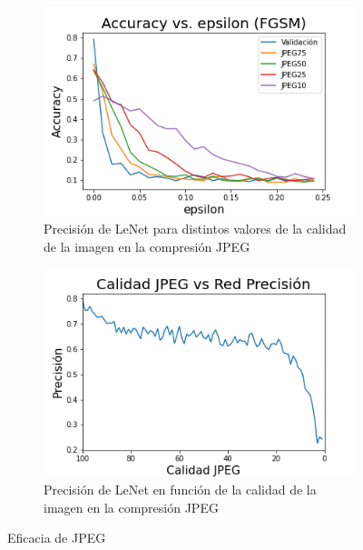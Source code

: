 \begin{figure}[h!]
    \centering
    \begin{subfigure}[b]{0.45\textwidth}
        \centering
        \includegraphics[width=\textwidth]{images/cifar-10/cifar_epsilon_accuracy.png}
        \caption{Precisión de LeNet para distintos valores de la calidad de la imagen en la compresión JPEG}
        \label{cifar_accuracy_epsilon}
    \end{subfigure}
    \hspace{4mm}
    \begin{subfigure}[b]{0.45\textwidth}
        \centering
        \includegraphics[width=\textwidth]{images/cifar-10/cifar_JPEG_accuracy.png}
        \caption{Precisión de LeNet en función de la calidad de la imagen en la compresión JPEG}
        \label{cifar_jpeg_accuracy}
    \end{subfigure}
    \caption{Eficacia de JPEG}
    \label{cifar_accuracy}
\end{figure}

